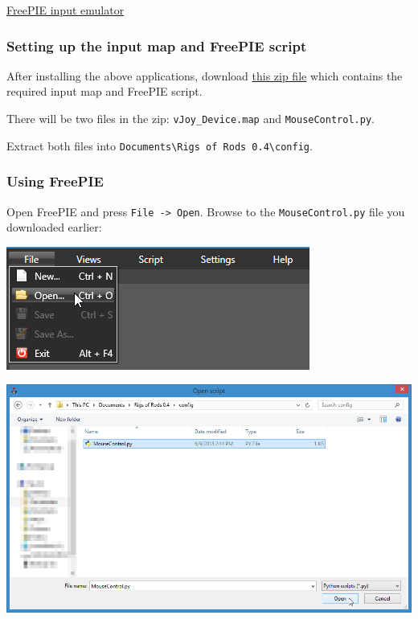 \href{http://andersmalmgren.github.io/FreePIE/index.html}{FreePIE input
emulator}

\hypertarget{setting-up-the-input-map-and-freepie-script}{%
\subsubsection{Setting up the input map and FreePIE
script}\label{setting-up-the-input-map-and-freepie-script}}

After installing the above applications, download
\href{/download/RoR_Mouse_Control.zip}{this zip file} which contains the
required input map and FreePIE script.

There will be two files in the zip: \texttt{vJoy\_Device.map} and
\texttt{MouseControl.py}.

Extract both files into
\texttt{Documents\textbackslash{}Rigs\ of\ Rods\ 0.4\textbackslash{}config}.

\hypertarget{using-freepie}{%
\subsubsection{Using FreePIE}\label{using-freepie}}

Open FreePIE and press \texttt{File\ -\textgreater{}\ Open}. Browse to
the \texttt{MouseControl.py} file you downloaded earlier:

\includegraphics{images/FreePIE-1.png}

\includegraphics{images/FreePIE-2.png}

